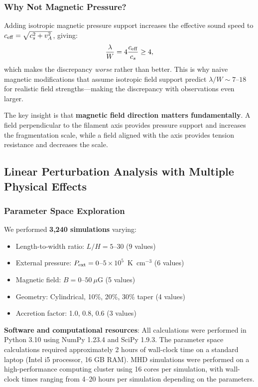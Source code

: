 \documentclass[11pt,a4paper]{article}
\begin{document}
\subsubsection{Why Not Magnetic Pressure?}

Adding isotropic magnetic pressure support increases the effective sound speed to $c_{\rm eff} = \sqrt{c_s^2 + v_A^2}$, giving:
\begin{equation}
\frac{\lambda}{W} = 4 \frac{c_{\rm eff}}{c_s} \geq 4,
\end{equation}
which makes the discrepancy \emph{worse} rather than better. This is why naive magnetic modifications that assume isotropic field support predict $\lambda/W \sim 7$--$18$ for realistic field strengths—making the discrepancy with observations even larger.

The key insight is that \textbf{magnetic field direction matters fundamentally}. A field perpendicular to the filament axis provides pressure support and increases the fragmentation scale, while a field aligned with the axis provides tension resistance and decreases the scale.

\subsection{Linear Perturbation Analysis with Multiple Physical Effects}

\subsubsection{Parameter Space Exploration}

We performed \textbf{3,240 simulations} varying:
\begin{itemize}
    \item Length-to-width ratio: $L/H = 5$--$30$ (9 values)
    \item External pressure: $P_{\rm ext} = 0$--$5 \times 10^5$~K~cm$^{-3}$ (6 values)
    \item Magnetic field: $B = 0$--$50~\mu$G (5 values)
    \item Geometry: Cylindrical, 10\%, 20\%, 30\% taper (4 values)
    \item Accretion factor: 1.0, 0.8, 0.6 (3 values)
\end{itemize}

\textbf{Software and computational resources}: All calculations were performed in Python 3.10 using NumPy 1.23.4 and SciPy 1.9.3. The parameter space calculations required approximately 2 hours of wall-clock time on a standard laptop (Intel i5 processor, 16 GB RAM). MHD simulations were performed on a high-performance computing cluster using 16 cores per simulation, with wall-clock times ranging from 4--20 hours per simulation depending on the parameters.
\end{document}
